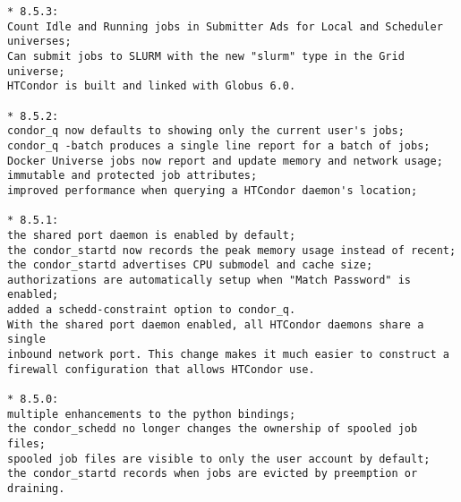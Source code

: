 \begin{verbatim}
* 8.5.3:
Count Idle and Running jobs in Submitter Ads for Local and Scheduler universes;
Can submit jobs to SLURM with the new "slurm" type in the Grid universe;
HTCondor is built and linked with Globus 6.0.

* 8.5.2:
condor_q now defaults to showing only the current user's jobs;
condor_q -batch produces a single line report for a batch of jobs;
Docker Universe jobs now report and update memory and network usage;
immutable and protected job attributes;
improved performance when querying a HTCondor daemon's location;

* 8.5.1:
the shared port daemon is enabled by default;
the condor_startd now records the peak memory usage instead of recent;
the condor_startd advertises CPU submodel and cache size;
authorizations are automatically setup when "Match Password" is enabled;
added a schedd-constraint option to condor_q.
With the shared port daemon enabled, all HTCondor daemons share a single
inbound network port. This change makes it much easier to construct a
firewall configuration that allows HTCondor use.

* 8.5.0:
multiple enhancements to the python bindings;
the condor_schedd no longer changes the ownership of spooled job files;
spooled job files are visible to only the user account by default;
the condor_startd records when jobs are evicted by preemption or draining.
\end{verbatim}
